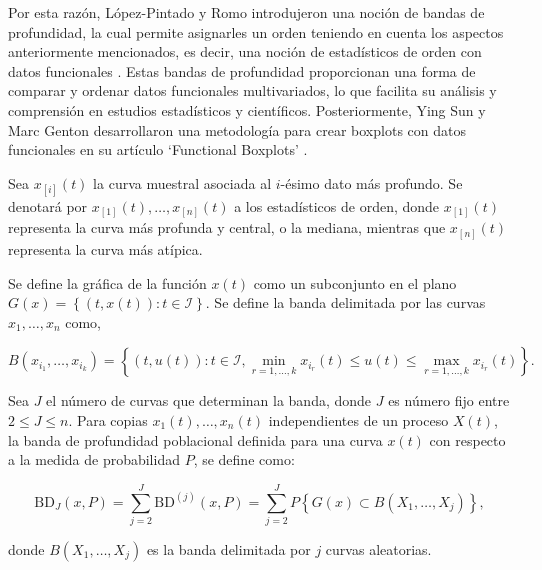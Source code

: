 Por esta razón, López-Pintado y Romo introdujeron una noción de bandas de profundidad, la cual permite asignarles un orden teniendo en cuenta los aspectos anteriormente mencionados, es decir, una noción de estadísticos de orden con datos funcionales \cite{RomoPintado}. Estas bandas de profundidad proporcionan una forma de comparar y ordenar datos funcionales multivariados, lo que facilita su análisis y comprensión en estudios estadísticos y científicos. Posteriormente, Ying Sun y Marc Genton desarrollaron una metodología para crear boxplots con datos funcionales en su artículo `Functional Boxplots' \cite{boxplotFun}.

Sea $x_{[i]}(t)$ la curva muestral asociada al $i$-ésimo dato más profundo. Se denotará por $x_{[1]}(t), \dots, x_{[n]}(t)$ a los estadísticos de orden, donde $x_{[1]}(t)$ representa la curva más profunda y central, o la mediana, mientras que $x_{[n]}(t)$ representa la curva más atípica.


\begin{defn}[Banda]
    Se define la gráfica de la función $x(t)$ como un subconjunto en el plano $G(x) =  \left\{ (t, x(t)): t \in \mathcal{I} \right\}$. Se define la banda delimitada por las curvas $x_1, \dots, x_n$ como,
    
    \begin{equation}
        B\left(x_{i_1}, \ldots, x_{i_k}\right)=\left\{(t, u(t)): t \in \mathcal{I}, \min_{r=1, \ldots, k} x_{i_r}(t) \leq u(t) \leq \max _{r=1, \ldots, k} x_{i_r}(t)\right\}.
    \end{equation}
\end{defn}

\begin{defn}
    Sea $J$ el número de curvas que determinan la banda, donde $J$ es número fijo entre $2 \leq J \leq n$. Para copias $x_1(t), \dots, x_n(t)$ independientes de un proceso $X(t)$, la banda de profundidad poblacional definida para una curva $x(t)$ con respecto a la medida de probabilidad $P$, se define como:

    \begin{equation}
        \mathrm{BD}_J(x, P)=\sum_{j=2}^J \mathrm{BD}^{(j)}(x, P)=\sum_{j=2}^J P\left\{G(x) \subset B\left(X_1, \ldots, X_j\right)\right\},
    \end{equation}

    donde $B(X_1, \dots, X_j)$ es la banda delimitada por $j$ curvas aleatorias.
\end{defn}

